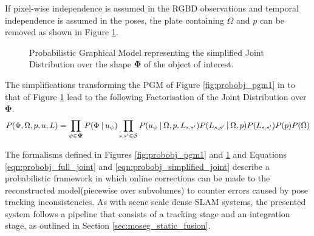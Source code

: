 If pixel-wise independence is assumed in the RGBD observations and temporal
independence is assumed in the poses, the plate containing $\Omega$ and $p$ can
be removed as shown in Figure \ref{fig:probobj_pgm2}.
\begin{figure}[ht]
  \label{fig:probobj_pgm2}
  \centering
  \caption[Probabilistic Object Reconstruction Formulation II]
  {Probabilistic Graphical Model representing the simplified Joint
    Distribution over the shape $\mathbf{\Phi}$ of the object of interest.}
\end{figure}

The simplifications transforming the PGM of Figure \ref{fig:probobj_pgm1} in to
that of Figure \ref{fig:probobj_pgm2} lead to the following Factorisation of the
Joint Distribution over $\mathbf{\Phi}$.
\begin{equation}
  \label{eqn:probobj_simplified_joint}
  P(\Phi, \Omega, p, u, L) = 
  \prod_{\psi \in \mathbf{\Psi}}P(\Phi \:\vert\: u_{\psi})
  \prod_{s, s' \in \mathcal{S}}P(u_{\psi} \:\vert\: \Omega, p, L_{s, s'})
  P(L_{s, s'} \:\vert\: \Omega, p) P(L_{s, s'})P(p)P(\Omega)
\end{equation}

The formalisms defined in Figures \ref{fig:probobj_pgm1} and
\ref{fig:probobj_pgm2} and Equations \ref{eqn:probobj_full_joint} and
\ref{eqn:probobj_simplified_joint} describe a probabilistic framework in which
online corrections can be made to the reconstructed model(piecewise over
subvolumes) to counter errors caused by pose tracking inconsistencies. As with
scene scale dense SLAM systems\cite{Newcombe2011, Prisacariu2014, Niessner2013},
the presented system follows a pipeline that consists of a tracking stage and an
integration stage, as outlined in Section \ref{sec:moseg_static_fusion}.


